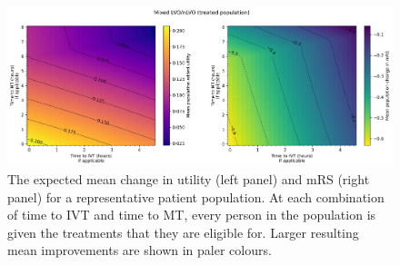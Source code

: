 \begin{figure}
    \centering
    \includegraphics[width=\columnwidth]{images/matrix_utility_and_mRS.jpg}
    \caption{
        The expected mean change in utility (left panel) and mRS (right panel) for a representative patient population. At each combination of time to IVT and time to MT, every person in the population is given the treatments that they are eligible for. Larger resulting mean improvements are shown in paler colours.
        }
    \label{app_fig:matrix}
\end{figure}



